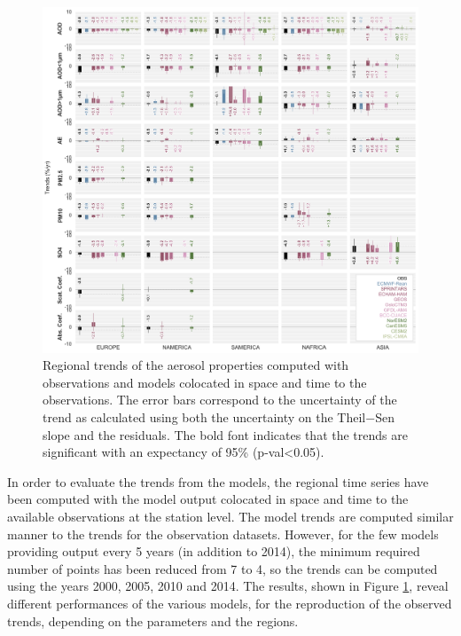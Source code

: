 \documentclass[journal abbreviation, manuscript]{copernicus}
\begin{document}
\begin{figure}[t]
 \includegraphics[width=16cm]{../scripts/figs/heatmaps/BARS.png}
 \caption{Regional trends of the aerosol properties computed with observations and models colocated in space and time to the observations. The error bars correspond to the uncertainty of the trend as calculated using both the uncertainty on the Theil−Sen slope and the residuals. The bold font indicates that the trends are significant with an expectancy of 95\% (p-val<0.05).}
 \label{fig:bars}
\end{figure}

In order to evaluate the trends from the models, the regional time series have been computed with the model output colocated in space and time to the available observations at the station level. The model trends are computed similar manner to the trends for the observation datasets. However, for the few models providing output every 5 years (in addition to 2014), the minimum required number of points has been reduced from 7 to 4, so the trends can be computed using the years 2000, 2005, 2010 and 2014. The results, shown in Figure \ref{fig:bars}, reveal different performances of the various models, for the reproduction of the observed trends, depending on the parameters and the regions.
\end{document}
